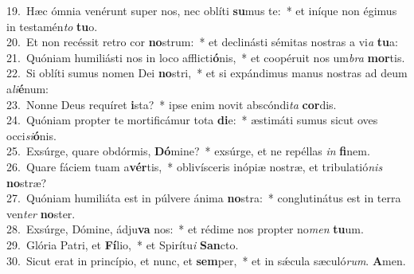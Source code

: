{19.~}Hæc ómnia venérunt super nos, nec oblíti \textbf{su}mus te:~* et iníque non égimus in testamén\textit{to} \textbf{tu}o.\\
{20.~}Et non recéssit retro cor \textbf{no}strum:~* et declinásti sémitas nostras a vi\textit{a} \textbf{tu}a:\\
{21.~}Quóniam humiliásti nos in loco afflicti\textbf{ó}nis,~* et coopéruit nos um\textit{bra} \textbf{mor}tis.\\
{22.~}Si oblíti sumus nomen Dei \textbf{no}stri,~* et si expándimus manus nostras ad deum a\textit{li}\textbf{é}num:\\
{23.~}Nonne Deus requíret \textbf{i}sta?~* ipse enim novit abscóndi\textit{ta} \textbf{cor}dis.\\
{24.~}Quóniam propter te mortificámur tota \textbf{di}e:~* æstimáti sumus sicut oves occi\textit{si}\textbf{ó}nis.\\
{25.~}Exsúrge, quare obdórmis, \textbf{Dó}mine?~* exsúrge, et ne repéllas \textit{in} \textbf{fi}nem.\\
{26.~}Quare fáciem tuam a\textbf{vér}tis,~* oblivísceris inópiæ nostræ, et tribulatió\textit{nis} \textbf{no}stræ?\\
{27.~}Quóniam humiliáta est in púlvere ánima \textbf{no}stra:~* conglutinátus est in terra ven\textit{ter} \textbf{no}ster.\\
{28.~}Exsúrge, Dómine, ádju\textbf{va} nos:~* et rédime nos propter no\textit{men} \textbf{tu}um.\\
{29.~}Glória Patri, et \textbf{Fí}lio,~* et Spirítu\textit{i} \textbf{San}cto.\\
{30.~}Sicut erat in princípio, et nunc, et \textbf{sem}per,~* et in sǽcula sæculó\textit{rum}. \textbf{A}men.\\
